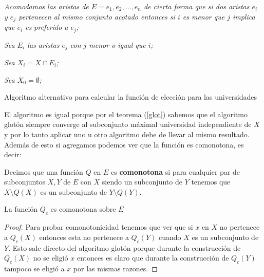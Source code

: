 \IncMargin{1em}
\begin{Algoritmo}[H]

\BlankLine
\emph{Acomodamos las aristas de $E=e_1,e_2,\dots,e_n$ de cierta forma que si dos aristas $e_i$ y $e_j$ pertenecen al mismo conjunto acotado entonces si $i$ es menor que $j$ implica que $e_i$ es preferido a $e_j$;}

\emph{Sea $E_i$ las aristas $e_j$ con $j$ menor o igual que $i$;}

\emph{Sea $X_i=X \cap E_i$;}

\emph{Sea $X_0 = \emptyset$;}


\caption{Algoritmo alternativo para calcular la función de elección para las universidades}
\end{Algoritmo}
\DecMargin{1em}

El algoritmo es igual porque por el teorema (\ref{glot}) sabemos que el algoritmo glotón siempre converge al subconjunto máximal universidad independiente de $X$ y por lo tanto aplicar uno u otro algoritmo debe de llevar al mismo resultado. Además de esto si agregamos podemos ver que la función es comonotona, es decir:

\begin{dfn}
Decimos que una función $Q$ en $E$ es \textbf{comonotona} si para cualquier par de subconjuntos $X,Y$ de $E$ con $X$ siendo un subconjunto de $Y$ tenemos que $X\setminus Q(X)$ es un subconjunto de $Y\setminus Q(Y)$.
\end{dfn}

\begin{cor}
La función $Q_c$ es comonotona sobre $E$
\end{cor}

\begin{proof}
Para probar comonotonicidad tenemos que ver que si $x$ en $X$ no pertenece a $Q_c(X)$ entonces esta no pertenece a $Q_c(Y)$ cuando $X$ es un subconjunto de $Y$. Esto sale directo del algoritmo glotón porque durante la construcción de $Q_c(X)$ no se eligió $x$ entonces es claro que durante la construcción de $Q_c(Y)$ tampoco se eligió a $x$ por las mismas razones. 
\end{proof}

